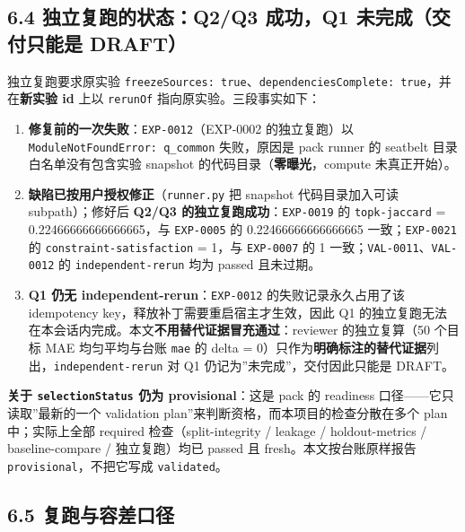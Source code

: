 \documentclass[
  11pt,
]{ctexart}
\providecommand{\tightlist}{%
  \setlength{\itemsep}{0pt}\setlength{\parskip}{0pt}}
\begin{document}
\subsection{6.4 独立复跑的状态：Q2/Q3 成功，Q1 未完成（交付只能是
DRAFT）}\label{ux72ecux7acbux590dux8dd1ux7684ux72b6ux6001q2q3-ux6210ux529fq1-ux672aux5b8cux6210ux4ea4ux4ed8ux53eaux80fdux662f-draft}

独立复跑要求原实验
\texttt{freezeSources:\ true}、\texttt{dependenciesComplete:\ true}，并在\textbf{新实验
id} 上以 \texttt{rerunOf} 指向原实验。三段事实如下：

\begin{enumerate}
\def\labelenumi{\arabic{enumi}.}
\tightlist
\item
  \textbf{修复前的一次失败}：\texttt{EXP-0012}（EXP-0002 的独立复跑）以
  \texttt{ModuleNotFoundError:\ q\_\allowbreak{}common} 失败，原因是 pack runner 的
  seatbelt 目录白名单没有包含实验 snapshot
  的代码目录（\textbf{零曝光}，compute 未真正开始）。
\item
  \textbf{缺陷已按用户授权修正}（\texttt{runner.py} 把 snapshot
  代码目录加入可读 subpath）；修好后 \textbf{Q2/Q3
  的独立复跑成功}：\texttt{EXP-0019} 的 \texttt{topk-jaccard} =
  0.22466666666666665，与 \texttt{EXP-0005} 的 0.22466666666666665
  一致；\texttt{EXP-0021} 的 \texttt{constraint-satisfaction} = 1，与
  \texttt{EXP-0007} 的 1 一致；\texttt{VAL-0011}、\texttt{VAL-0012} 的
  \texttt{independent-rerun} 均为 passed 且未过期。
\item
  \textbf{Q1 仍无 independent-rerun}：\texttt{EXP-0012}
  的失败记录永久占用了该 idempotency
  key，释放补丁需要重启宿主才生效，因此 Q1
  的独立复跑无法在本会话内完成。本文\textbf{不用替代证据冒充通过}：reviewer
  的独立复算（50 个目标 MAE 均匀平均与台账 \texttt{mae} 的 delta =
  0）只作为\textbf{明确标注的替代证据}列出，\texttt{independent-rerun}
  对 Q1 仍记为''未完成''，交付因此只能是 DRAFT。
\end{enumerate}

\textbf{关于 \texttt{selectionStatus} 仍为 provisional}：这是 pack 的
readiness 口径------它只读取''最新的一个 validation
plan''来判断资格，而本项目的检查分散在多个 plan 中；实际上全部 required
检查（split-integrity / leakage / holdout-metrics / baseline-compare /
独立复跑）均已 passed 且 fresh。本文按台账原样报告
\texttt{provisional}，不把它写成 \texttt{validated}。

\subsection{6.5
复跑与容差口径}\label{ux590dux8dd1ux4e0eux5bb9ux5deeux53e3ux5f84}
\end{document}
